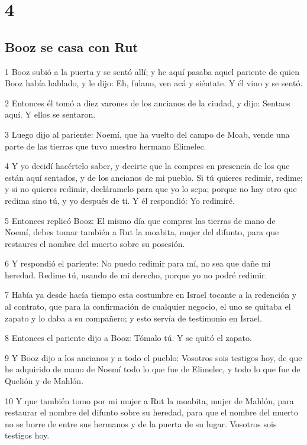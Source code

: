 \chapter{4}

\section*{Booz se casa con Rut}

\par 1 Booz subió a la puerta y se sentó allí; y he aquí pasaba aquel pariente de quien Booz había hablado, y le dijo: Eh, fulano, ven acá y siéntate. Y él vino y se sentó.
\par 2 Entonces él tomó a diez varones de los ancianos de la ciudad, y dijo: Sentaos aquí. Y ellos se sentaron.
\par 3 Luego dijo al pariente: Noemí, que ha vuelto del campo de Moab, vende una parte de las tierras que tuvo nuestro hermano Elimelec.
\par 4 Y yo decidí hacértelo saber, y decirte que la compres en presencia de los que están aquí sentados, y de los ancianos de mi pueblo. Si tú quieres redimir, redime; y si no quieres redimir, decláramelo para que yo lo sepa; porque no hay otro que redima sino tú, y yo después de ti. Y él respondió: Yo redimiré.
\par 5 Entonces replicó Booz: El mismo día que compres las tierras de mano de Noemí, debes tomar también a Rut la moabita, mujer del difunto, para que restaures el nombre del muerto sobre su posesión.
\par 6 Y respondió el pariente: No puedo redimir para mí, no sea que dañe mi heredad. Redime tú, usando de mi derecho, porque yo no podré redimir.
\par 7 Había ya desde hacía tiempo esta costumbre en Israel tocante a la redención y al contrato, que para la confirmación de cualquier negocio, el uno se quitaba el zapato y lo daba a su compañero; y esto servía de testimonio en Israel.
\par 8 Entonces el pariente dijo a Booz: Tómalo tú. Y se quitó el zapato. 
\par 9 Y Booz dijo a los ancianos y a todo el pueblo: Vosotros sois testigos hoy, de que he adquirido de mano de Noemí todo lo que fue de Elimelec, y todo lo que fue de Quelión y de Mahlón.
\par 10 Y que también tomo por mi mujer a Rut la moabita, mujer de Mahlón, para restaurar el nombre del difunto sobre su heredad, para que el nombre del muerto no se borre de entre sus hermanos y de la puerta de su lugar. Vosotros sois testigos hoy.
